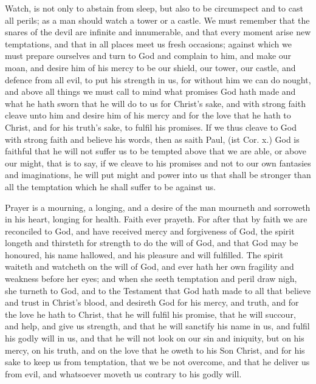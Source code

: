 Watch, is not only to abstain from sleep, but also to 
be circumspect and to cast all perils; as a man should 
watch a tower or a castle. We must remember that the 
snares of the devil are infinite and innumerable, and that 
every moment arise new temptations, and that in all places 
meet us fresh occasions; against which we must prepare 
ourselves and turn to God and complain to him, and make 
our moan, and desire him of his mercy to be our shield, 
our tower, our castle, and defence from all evil, to put his 
strength in us, for without him we can do nought, and 
above all things we must call to mind what promises God 
hath made and what he hath sworn that he will do to us 
for Christ's sake, and with strong faith cleave unto him and 
desire him of his mercy and for the love that he hath to 
Christ, and for his truth's sake, to fulfil his promises. If 
we thus cleave to God with strong faith and believe his 
words, then as saith Paul, (ist Cor. x.) God is faithful that 
he will not suffer us to be tempted above that we are able, 
or above our might, that is to say, if we cleave to his promises
and not to our own fantasies and imaginations, he 
will put might and power into us that shall be stronger than 
all the temptation which he shall suffer to be against us. 


Prayer is a mourning, a longing, and a desire of the
man mourneth and sorroweth in his heart, longing for 
health. Faith ever prayeth. For after that by faith we 
are reconciled to God, and have received mercy and forgiveness
of God, the spirit longeth and thirsteth for 
strength to do the will of God, and that God may be 
honoured, his name hallowed, and his pleasure and will 
fulfilled. The spirit waiteth and watcheth on the will of 
God, and ever hath her own fragility and weakness before 
her eyes; and when she seeth temptation and peril draw 
nigh, she turneth to God, and to the Testament that God 
hath made to all that believe and trust in Christ's blood, 
and desireth God for his mercy, and truth, and for the love he 
hath to Christ, that he will fulfil his promise, that he will 
succour, and help, and give us strength, and that he will sanctify
his name in us, and fulfil his godly will in us, and that 
he will not look on our sin and iniquity, but on his mercy, 
on his truth, and on the love that he oweth to his Son 
Christ, and for his sake to keep us from temptation, that 
we be not overcome, and that he deliver us from evil, and 
whatsoever moveth us contrary to his godly will. 

